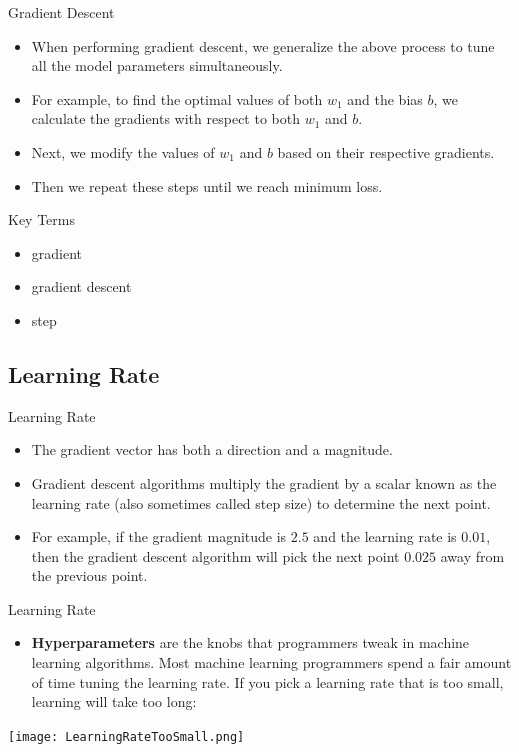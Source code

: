 \documentclass{beamer}
\begin{document}
\begin{frame}{Gradient Descent}
\begin{itemize}
    \item When performing gradient descent, we generalize the above process to tune all the model parameters simultaneously. 
    
    \item For example, to find the optimal values of both $w_1$ and the bias $b$, we calculate the gradients with respect to both $w_1$ and $b$. 
    
    \item Next, we modify the values of $w_1$ and $b$ based on their respective gradients. 
    \item Then we repeat these steps until we reach minimum loss.
\end{itemize}
\end{frame}


\begin{frame}{Key Terms}
\begin{itemize}
    \item gradient
    \item gradient descent
    \item step
\end{itemize}
\end{frame}


\subsection{Learning Rate}

\begin{frame}{Learning Rate}
\begin{itemize}
    \item The gradient vector has both a direction and a magnitude. 
    \item Gradient descent algorithms multiply the gradient by a scalar known as the learning rate (also sometimes called step size) to determine the next point. 
    \item For example, if the gradient magnitude is $2.5$ and the learning rate is $0.01$, then the gradient descent algorithm will pick the next point $0.025$ away from the previous point.
\end{itemize}
\end{frame}

\begin{frame}{Learning Rate}
\begin{itemize}
    \item {\bf Hyperparameters} are the knobs that programmers tweak in machine learning algorithms. Most machine learning programmers spend a fair amount of time tuning the learning rate. If you pick a learning rate that is too small, learning will take too long:
\end{itemize}
\texttt{[image: LearningRateTooSmall.png]}
\end{frame}
\end{document}
